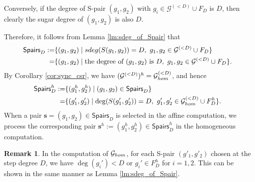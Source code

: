 \documentclass{article}
\theoremstyle{definition}
\newtheorem{remark}[theorem]{Remark}
\theoremstyle{plain}
\theoremstyle{plain}
\theoremstyle{plain}
\theoremstyle{plain}
\numberwithin{equation}{subsection}
\begin{document}
Conversely, if the degree of S-pair $(g_1,g_2)$ with $g_i \in \mathcal{G}^{(<D)}\cup F_D$ is $D$, then clearly the sugar degree of $(g_1,g_2)$ is also $D$.

Therefore, it follows from Lemma \ref{lm:sdeg_of_Spair} that
\begin{align*}
    \mathsf{Spairs}_D :=& \{(g_1,g_2)\mid {\rm sdeg}(S(g_1,g_2))=D,\ g_1,g_2\in \mathcal{G}^{(<D)} \cup F_D\}\\
    =& \{(g_1,g_2)\mid \mbox{the degree of $(g_1,g_2)$ is $D$},
    \ g_1,g_2\in \mathcal{G}^{(<D)} \cup F_D\}.
\end{align*}
By Corollary \ref{cor:sync_csr}, we have $(\mathcal{G}^{(<D)})^h=\mathcal{G}_{\rm hom}^{(<D)}$, and hence
\begin{align*}
    \mathsf{Spairs}_D^h :=&\{(g_1^{h},g_2^{h})\mid (g_1,g_2)\in \mathsf{Spairs}_D\}\\
    =&\{(g'_1,g'_2)\mid \deg(S(g'_1,g'_2))=D,\ g'_1,g'_2\in \mathcal{G}_{\rm hom}^{(<D)}\cup F_D^h\}.
\end{align*}
When a pair $\bm{s}=(g_1,g_2)\in\mathsf{Spairs}_D$ is selected in the affine computation, we process the corresponding pair $\bm{s}^h:=(g_1^h,g_2^h)\in\mathsf{Spairs}_D^h$ in the homogeneous computation.

\begin{remark} 
In the computation of $\mathcal{G}_{\rm hom}$, for each S-pair $(g'_1,g'_2)$ chosen at the step degree $D$, we have $\deg(g_i')<D$ or $g_i'\in F^h_D$ for $i=1,2$. 
This can be shown in the same manner as Lemma \ref{lm:sdeg_of_Spair}. 
\end{remark}
\end{document}

